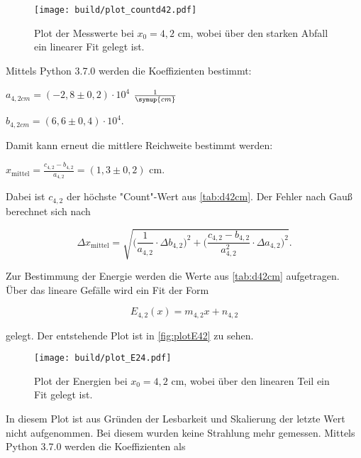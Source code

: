 

\begin{figure}
    \centering
    \texttt{[image: build/plot\_countd42.pdf]}
    \caption{Plot der Messwerte bei $x_0 = 4,2$ cm, wobei über den starken Abfall ein linearer Fit gelegt ist.}
    \label{fig:plot42}
\end{figure}

Mittels Python 3.7.0 werden die Koeffizienten bestimmt:

\begin{center}
    $a_{4,2cm} = (-2,8 \pm 0,2) \cdot 10^{4}$ $\frac{1}{\symup{cm}}$

    $b_{4,2cm} = (6,6 \pm 0,4) \cdot 10^{4}$.
\end{center}

Damit kann erneut die mittlere Reichweite bestimmt werden:

\begin{center}
    $x_\text{mittel} = \frac{c_{4,2} - b_{4,2}}{a_{4,2}} = (1,3 \pm 0,2)$ cm.
\end{center}

Dabei ist $c_{4,2}$ der höchste "Count"-Wert aus \autoref{tab:d42cm}. Der Fehler nach  Gauß berechnet sich nach

\begin{equation}
    \Delta x_\text{mittel} = \sqrt{\bigg(\frac{1}{a_{4,2}} \cdot \Delta b_{4,2} \bigg)^2 + \bigg( \frac{c_{4,2}-b_{4,2}}{a_{4,2}^2} \cdot \Delta a_{4,2} \bigg)^2}.
\end{equation}

Zur Bestimmung der Energie werden die Werte aus \autoref{tab:d42cm} aufgetragen. Über das lineare Gefälle wird ein Fit der Form

\begin{equation}
    E_{4,2}(x) = m_{4,2} x + n_{4,2}
\end{equation}

gelegt. Der entstehende Plot ist in \autoref{fig:plotE42} zu sehen.

\begin{figure}
    \centering
    \texttt{[image: build/plot\_E24.pdf]}
    \caption{Plot der Energien bei $x_0 = 4,2$ cm, wobei über den linearen Teil ein Fit gelegt ist.}
    \label{fig:plotE24}
\end{figure}

In diesem Plot ist aus Gründen der Lesbarkeit und Skalierung der letzte Wert nicht aufgenommen. Bei diesem wurden keine Strahlung mehr gemessen.
Mittels Python 3.7.0 werden die Koeffizienten als

